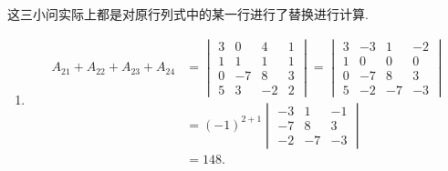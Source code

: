 \documentclass[UTF8,12pt,a4paper,fontset=fandol]{ctexart}
\begin{document}
\begin{solve}
这三小问实际上都是对原行列式中的某一行进行了替换进行计算.
            \begin{enumerate}
                \item \begin{align*}
                            A_{21}+A_{22}+A_{23}+A_{24}
                            & = \begin{vmatrix}
                                    3 & 0  & 4  & 1 \\
                                    1 & 1  & 1  & 1 \\
                                    0 & -7 & 8  & 3 \\
                                    5 & 3  & -2 & 2
                                \end{vmatrix}
                            = \begin{vmatrix}
                                3 & -3 & 1  & -2 \\
                                1 & 0  & 0  & 0  \\
                                0 & -7 & 8  & 3  \\
                                5 & -2 & -7 & -3
                            \end{vmatrix}             \\
                            & = (-1)^{2+1} \begin{vmatrix}
                                                -3 & 1  & -1 \\
                                                -7 & 8  & 3  \\
                                                -2 & -7 & -3
                                            \end{vmatrix} \\
                            & = 148.
                        \end{align*}


\end{enumerate}
\end{solve}
\end{document}
